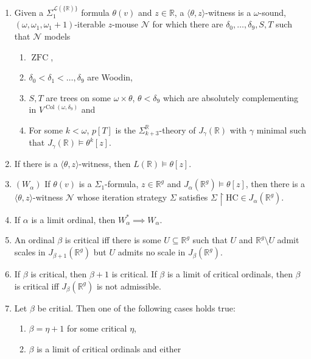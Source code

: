 \documentclass[12pt,a4paper]{article}
\theoremstyle{nicestyle}
\DeclareMathOperator{\Col}{Col}
\DeclareMathOperator{\ZFC}{ZFC}
\begin{document}
\begin{enumerate}
\item Given a $\Sigma_1^{\mathcal{L}(\{\mathbb{R})\}}$ formula $\theta(v)$
  and $z \in \mathbb{R}$, a $\langle \theta, z \rangle$-witness is a
  $\omega$-sound, $(\omega, \omega_{1}, \omega_1+1)$-iterable
  $z$-mouse $\mathcal{N}$ for which there are
  $\delta_0, \ldots, \delta_9, S, T$ such that $\mathcal{N}$ models
  \begin{enumerate}
  \item $\ZFC$,
  \item $\delta_0 < \delta_1 < \ldots, \delta_9$ are Woodin,
  \item $S, T$ are trees on some $\omega \times \theta$,
    $\theta < \delta_9$ which are absolutely complementing in
    $V^{\Col(\omega, \delta_{9})}$ and
  \item For some $k < \omega$, $p[T]$ is the
    $\Sigma_{k+3}^{\mathbb{R}}$-theory of $J_{\gamma}(\mathbb{R})$
    with $\gamma$ minimal such that
    $J_{\gamma}(\mathbb{R}) \models \theta^k[z]$.
  \end{enumerate}
\item If there is a $\langle \theta, z \rangle$-witness, then
  $L(\mathbb{R}) \models \theta[z]$.
\item $(W_{\alpha})$ If $\theta(v)$ is a $\Sigma_{1}$-formula,
  $z \in \mathbb{R}^g$ and
  $J_{\alpha}(\mathbb{R}^{g}) \models \theta[z]$, then there is a
  $\langle \theta, z \rangle$-witness $\mathcal{N}$ whose iteration
  strategy $\Sigma$ satisfies
  $\Sigma \restriction \mathrm{HC} \in J_{\alpha}(\mathbb{R}^g)$.
\item If $\alpha$ is a limit ordinal, then
  $W_{\alpha}^{*} \implies W_{\alpha}$.
\item An ordinal $\beta$ is critical iff there is some
  $U \subseteq \mathbb{R}^g$ such that $U$ and
  $\mathbb{R}^g \setminus U$ admit scales in
  $J_{\beta+1}(\mathbb{R}^{g})$ but $U$ admits no scale in
  $J_{\beta}(\mathbb{R}^{g})$.
\item If $\beta$ is critical, then $\beta+1$ is critical. If $\beta$
  is a limit of critical ordinals, then $\beta$ is critical iff
  $J_{\beta}(\mathbb{R}^g)$ is not admissible.
\item Let $\beta$ be critial. Then one of the following cases holds true:
  \begin{enumerate}[(1)]
  \item $\beta = \eta + 1$ for some critical $\eta$,
  \item $\beta$ is a limit of critical ordinals and either
    \begin{enumerate}[(a)]

\end{enumerate}
\end{enumerate}
\end{enumerate}
\end{document}
